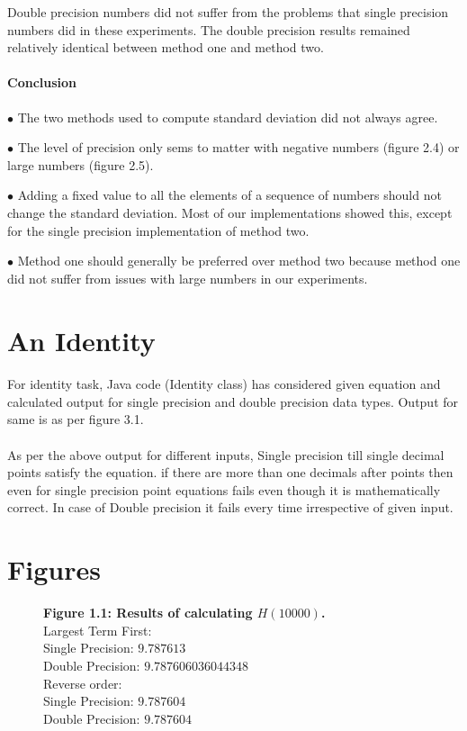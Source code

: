 \documentclass[12pt]{article}
\begin{document}
Double precision numbers did not suffer from the problems that single precision numbers did in these experiments. The double precision results remained relatively identical between method one and method two.

\paragraph{Conclusion}
$\bullet$ The two methods used to compute standard deviation did not always agree.

$\bullet$ The level of precision only sems to matter with negative numbers (figure 2.4) or large numbers (figure 2.5).

$\bullet$ Adding a fixed value to all the elements of a sequence of numbers should not change the standard deviation. Most of our implementations showed this, except for the single precision implementation of method two.

$\bullet$ Method one should generally be preferred over method two because method one did not suffer from issues with large numbers in our experiments.

\section{An Identity}
\paragraph{}For identity task, Java code (Identity class) has considered given equation and calculated output for single precision and double precision data types. Output for same is as per figure 3.1. \\

\paragraph{} As per the above output for different inputs, Single precision till single decimal points satisfy the equation. if there are more than one decimals after points then even for single precision point equations fails even though it is mathematically correct. In case of Double precision it fails every time irrespective of given input.

\newpage
\section{Figures}
\begin{figure}[h]
	\textbf{Figure 1.1: Results of calculating $H(10000)$.}\\
	
	Largest Term First:\\
	Single Precision: $9.787613$\\
	Double Precision: $9.787606036044348$\\
	
	Reverse order:\\
	Single Precision: $9.787604$\\
	Double Precision: $9.787604$	
\end{figure}
\end{document}
